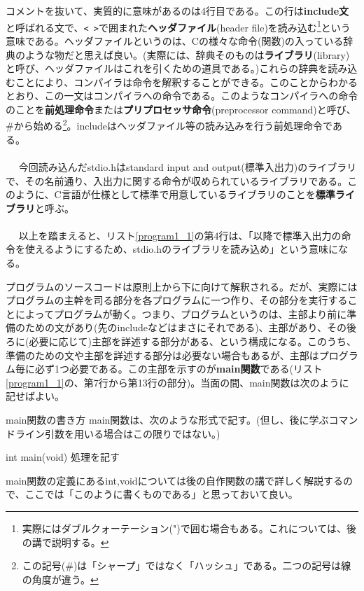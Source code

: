 コメントを抜いて、実質的に意味があるのは4行目である。この行は\textbf{include文}と呼ばれる文で、\verb|< >|で囲まれた\textbf{ヘッダファイル}(header file)を読み込む\footnote{実際にはダブルクォーテーション(")で囲む場合もある。これについては、後の講で説明する。}という意味である。ヘッダファイルというのは、Cの様々な命令(関数)の入っている辞典のような物だと思えば良い。(実際には、辞典そのものは\textbf{ライブラリ}(library)と呼び、ヘッダファイルはこれを引くための道具である。)これらの辞典を読み込むことにより、コンパイラは命令を解釈することができる。このことからわかるとおり、この一文はコンパイラへの命令である。このようなコンパイラへの命令のことを\textbf{前処理命令}または\textbf{プリプロセッサ命令}(preprocessor command)と呼び、\#から始める\footnote{この記号(\#)は「シャープ」ではなく「ハッシュ」である。二つの記号は線の角度が違う。}。includeはヘッダファイル等の読み込みを行う前処理命令である。
\\ \\　
今回読み込んだstdio.hはstandard input and output(標準入出力)のライブラリで、その名前通り、入出力に関する命令が収められているライブラリである。このように、C言語が仕様として標準で用意しているライブラリのことを\textbf{標準ライブラリ}と呼ぶ。
\\ \\　
以上を踏まえると、リスト\ref{program1_1}の第4行は、「以降で標準入出力の命令を使えるようにするため、stdio.hのライブラリを読み込め」という意味になる。

プログラムのソースコードは原則上から下に向けて解釈される。だが、実際にはプログラムの主幹を司る部分を各プログラムに一つ作り、その部分を実行することによってプログラムが動く。つまり、プログラムというのは、主部より前に準備のための文があり(先のincludeなどはまさにそれである)、主部があり、その後ろに(必要に応じて)主部を詳述する部分がある、という構成になる。このうち、準備のための文や主部を詳述する部分は必要ない場合もあるが、主部はプログラム毎に必ず1つ必要である。この主部を示すのが\textbf{main関数}である(リスト\ref{program1_1}の、第7行から第13行の部分)。当面の間、main関数は次のように記せばよい。
\begin{itembox}[l]{main関数の書き方}
main関数は、次のような形式で記す。(但し、後に学ぶコマンドライン引数を用いる場合はこの限りではない。)
\begin{code}
int main(void){
  処理を記す
}
\end{code}
\end{itembox}
main関数の定義にあるint,voidについては後の自作関数の講で詳しく解説するので、ここでは「このように書くものである」と思っておいて良い。


